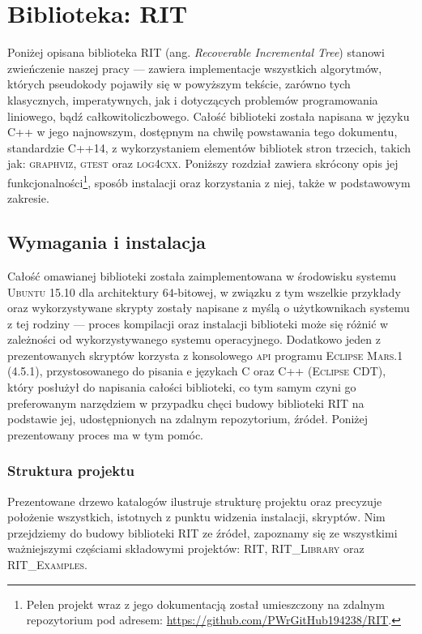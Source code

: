 \chapter{Biblioteka:  RIT}
\label{app:takeMeHome}
\thispagestyle{appendixStyle}

Poniżej opisana biblioteka \textsc{RIT} (ang. \textit{Recoverable Incremental Tree}) stanowi zwieńczenie naszej pracy --- zawiera implementacje wszystkich algorytmów, których pseudokody pojawiły się w powyższym tekście, zarówno tych klasycznych, imperatywnych, jak i dotyczących problemów programowania liniowego, bądź całkowitoliczbowego. Całość biblioteki została napisana w języku \textsc{C++} w jego najnowszym, dostępnym na chwilę powstawania tego dokumentu, standardzie \textsc{C++14}, z wykorzystaniem elementów bibliotek stron trzecich, takich jak: \textsc{graphviz}, \textsc{gtest} oraz \textsc{log4cxx}. Poniższy rozdział zawiera skrócony opis jej funkcjonalności\footnote{Pełen projekt wraz z jego dokumentacją został umieszczony na zdalnym repozytorium pod adresem: \url{https://github.com/PWrGitHub194238/RIT}.}, sposób instalacji oraz korzystania z niej, także w podstawowym zakresie.

\section{Wymagania i instalacja}

Całość omawianej biblioteki została zaimplementowana w środowisku systemu \textsc{Ubuntu 15.10} dla architektury $64$-bitowej, w związku z tym wszelkie przykłady oraz wykorzystywane skrypty zostały napisane z myślą o użytkownikach systemu z tej rodziny --- proces kompilacji oraz instalacji biblioteki może się różnić w zależności od wykorzystywanego systemu operacyjnego. Dodatkowo jeden z prezentowanych skryptów korzysta z konsolowego \textsc{api} programu \textsc{Eclipse Mars.1 (4.5.1)}, przystosowanego do pisania e językach \textsc{C} oraz \textsc{C++} (\textsc{Eclipse CDT}), który posłużył do napisania całości biblioteki, co tym samym czyni go preferowanym narzędziem w przypadku chęci budowy biblioteki \textsc{RIT} na podstawie jej, udostępnionych na zdalnym repozytorium, źródeł. Poniżej prezentowany proces ma w tym pomóc. 

\subsection{Struktura projektu}

Prezentowane drzewo katalogów ilustruje strukturę projektu oraz precyzuje położenie wszystkich, istotnych z punktu widzenia instalacji, skryptów. Nim przejdziemy do budowy biblioteki \textsc{RIT} ze źródeł, zapoznamy się ze wszystkimi ważniejszymi częściami składowymi projektów: \textsc{RIT}, \textsc{RIT\_Library} oraz \textsc{RIT\_Examples}.

